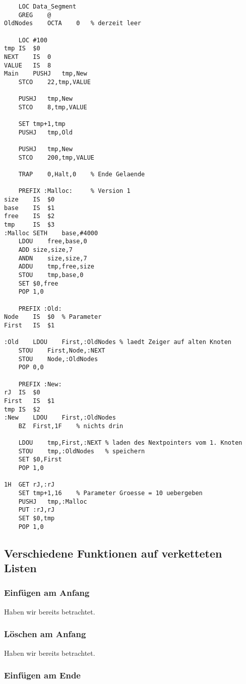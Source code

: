 \begin{lstlisting}
	LOC Data_Segment
	GREG	@
OldNodes	OCTA	0	% derzeit leer

	LOC #100
tmp	IS	$0
NEXT	IS	0
VALUE 	IS	8
Main	PUSHJ	tmp,New
	STCO	22,tmp,VALUE
	
	PUSHJ	tmp,New	
	STCO	8,tmp,VALUE
	
	SET	tmp+1,tmp
	PUSHJ	tmp,Old
	
	PUSHJ	tmp,New
	STCO	200,tmp,VALUE
	
	TRAP	0,Halt,0	% Ende Gelaende
	
	PREFIX :Malloc:		% Version 1
size	IS	$0
base	IS	$1
free	IS	$2
tmp		IS	$3
:Malloc SETH	base,#4000
	LDOU	free,base,0
	ADD	size,size,7
	ANDN	size,size,7
	ADDU	tmp,free,size
	STOU	tmp,base,0
	SET	$0,free 
	POP	1,0	
	
	PREFIX :Old:
Node	IS	$0	% Parameter
First	IS	$1

:Old	LDOU	First,:OldNodes % laedt Zeiger auf alten Knoten
	STOU	First,Node,:NEXT
	STOU	Node,:OldNodes
	POP	0,0
	
	PREFIX :New:
rJ	IS	$0
First	IS	$1	
tmp	IS	$2
:New	LDOU	First,:OldNodes
	BZ	First,1F	% nichts drin
	
	LDOU	tmp,First,:NEXT	% laden des Nextpointers vom 1. Knoten
	STOU	tmp,:OldNodes	% speichern
	SET	$0,First
	POP	1,0
	
1H	GET	rJ,:rJ
	SET	tmp+1,16	% Parameter Groesse = 10 uebergeben
	PUSHJ	tmp,:Malloc
	PUT	:rJ,rJ
	SET	$0,tmp
	POP	1,0

\end{lstlisting}

\subsection{Verschiedene Funktionen auf verketteten Listen}

\subsubsection{Einfügen am Anfang}
Haben wir bereits betrachtet.

\subsubsection{Löschen am Anfang}
Haben wir bereits betrachtet.

\subsubsection{Einfügen am Ende}

